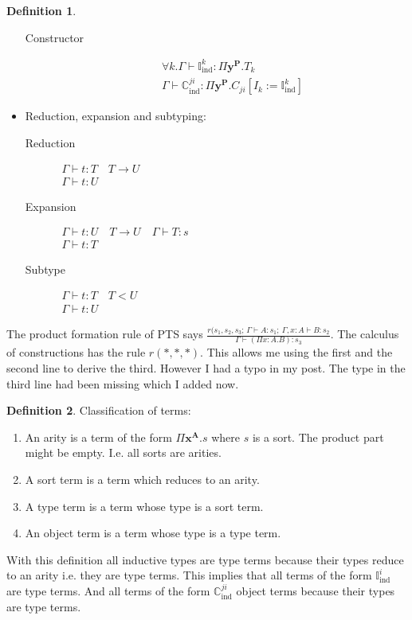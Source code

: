 \documentclass[12pt]{article}
\def\ind{\text{Ind}}
\def\Abold{\mathbf{A}}
\def\Pbold{\mathbf{P}}
\def\xbold{\mathbf{x}}
\def\ybold{\mathbf{y}}
\def\ind{\text{ind}}
\newcommand{\Induct}[2]{\mathbb{I}^#1_#2}
\newcommand{\Con}[3]{\mathbb{C}^{#1 #2}_#3}
\newcommand{\ruleh}[2]{\begin{array}{c} #1 \\ \hline #2\end{array}}
\newcommand{\rulev}[2]{\begin{array}{l} #1 \\ \hline #2\end{array}}
\theoremstyle{definition} \newtheorem{definition}{Definition}[section]
\theoremstyle{definition} \newtheorem{theorem}[definition]{Theorem}
\theoremstyle{definition} \newtheorem{lemma}[definition]{Lemma}
\begin{document}
\begin{definition}
\begin{itemize}
\begin{description}
    \item[Constructor]
      $$\rulev
      {\forall k. \Gamma\vdash \Induct{k}{\ind} : \Pi \ybold^\Pbold . T_k
      }
      {\Gamma\vdash \Con{j}{i}{\ind}:
        \Pi\ybold^\Pbold. C_{ji}[I_k:= \Induct{k}{\ind}]}$$
    \end{description}


  \item Reduction, expansion and subtyping:
    \begin{description}
    \item [Reduction]
      $\ruleh{\Gamma \vdash t:T \quad T \to U}{\Gamma\vdash t:U}$

    \item [Expansion]
      $\ruleh
      {\Gamma \vdash t:U \quad T \to U \quad\Gamma\vdash T:s}
      {\Gamma\vdash t:T}$

    \item [Subtype]
      $\ruleh
      {\Gamma \vdash t:T \quad T < U}
      {\Gamma\vdash t:U}$
    \end{description}
  \end{itemize}
\end{definition}

The product formation rule of PTS says
$\frac{r(s_1,s_2,s_3;\, \Gamma\vdash A:s_1;\: \Gamma,x:A\vdash
  B:s_2}{\Gamma\vdash (\Pi x:A.B): s_3}$. The calculus of constructions has
the rule $r(*,*,*)$. This allows me using the first and the second line to
derive the third. However I had a typo in my post. The type in the third line
had been missing which I added now.

\begin{definition}
  Classification of terms:
  \begin{enumerate}

  \item An arity is a term of the form $\Pi \xbold^\Abold.s$ where $s$ is
    a sort. The product part might be empty. I.e. all sorts are arities.

  \item A sort term is a term which reduces to an arity.

  \item A type term is a term whose type is a sort term.

  \item An object term is a term whose type is a type term.
  \end{enumerate}
\end{definition}

With this definition all inductive types are type terms because their types
reduce to an arity i.e. they are type terms. This implies that all terms of
the form $\Induct{i}{\ind}$ are type terms. And all terms of the form
$\Con{j}{i}{\ind}$ object terms because their types are type terms.
\end{document}
